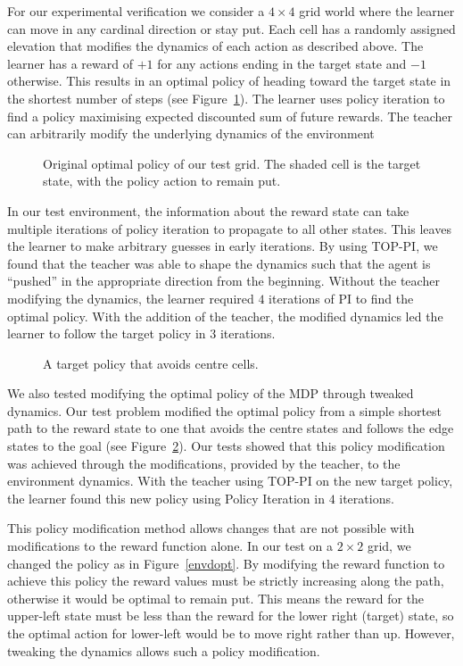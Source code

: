 For our experimental verification we consider a $4 \times 4$ grid world where the learner can move in any cardinal direction or stay put.  Each cell has a randomly assigned elevation that modifies the dynamics of each action as described above.  The learner has a reward of $+1$ for any actions ending in the target state and $-1$ otherwise.  This results in an optimal policy of heading toward the target state in the shortest number of steps (see Figure~\ref{prevopt}).  The learner uses policy iteration to find a policy maximising expected discounted sum of future rewards.  The teacher can arbitrarily modify the underlying dynamics of the environment

\begin{figure}[ht]
\centerline{}
\caption{\label{prevopt}Original optimal policy of our test grid.  The shaded cell is the target state, with the policy action to remain put.}
\end{figure}

In our test environment, the information about the reward state can take multiple iterations of policy iteration to propagate to all other states.  This leaves the learner to make arbitrary guesses in early iterations.  By using TOP-PI, we found that the teacher was able to shape the dynamics such that the agent is ``pushed'' in the appropriate direction from the beginning.  Without the teacher modifying the dynamics, the learner required $4$ iterations of PI to find the optimal policy.  With the addition of the teacher, the modified dynamics led the learner to follow the target policy in $3$ iterations.

\begin{figure}[ht]
\centerline{}
\caption{\label{newopt}A target policy that avoids centre cells.}
\end{figure}

We also tested modifying the optimal policy of the MDP through tweaked dynamics.  Our test problem modified the optimal policy from a simple shortest path to the reward state to one that avoids the centre states and follows the edge states to the goal (see Figure~\ref{newopt}).  Our tests showed that this policy modification was achieved through the modifications, provided by the teacher, to the environment dynamics.   With the teacher using TOP-PI on the new target policy, the learner found this new policy using Policy Iteration in $4$ iterations.  

This policy modification method allows changes that are not possible with modifications to the reward function alone.  In our test on a $2 \times 2$ grid, we changed the policy as in Figure~\ref{envdopt}.  By modifying the reward function to achieve this policy the reward values must be strictly increasing along the path, otherwise it would be optimal to remain put.  This means the reward for the upper-left state must be less than the reward for the lower right (target) state, so the optimal action for lower-left would be to move right rather than up.  However, tweaking the dynamics allows such a policy modification.

